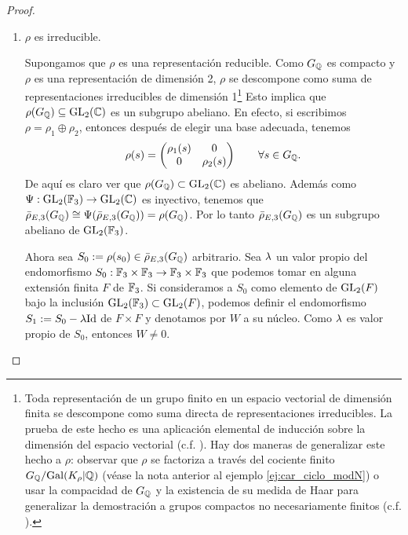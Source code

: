 \documentclass[../../tesis_maestria]{subfiles}
\begin{document}
\begin{proof}
\begin{enumerate}[label=\emph{\roman*})]
  \item $\rho$ es irreducible.

    \-\;\; Supongamos que $\rho$ es una representaci\'on reducible. Como $G_{\mathbb{Q}}$ es compacto y $\rho$ es una representaci\'on de dimensi\'on 2, $\rho$ se descompone como suma de representaciones irreducibles de dimensi\'on 1\footnote{Toda representaci\'on de un grupo finito en un espacio vectorial de dimensi\'on finita se descompone como suma directa de representaciones irreducibles. La prueba de este hecho es una aplicaci\'on elemental de inducci\'on sobre la dimensi\'on del espacio vectorial (c.f. \cite[\S1.4]{SerreLROFG}). Hay dos maneras de generalizar este hecho a $\rho$: observar que $\rho$ se factoriza a trav\'es del cociente finito $G_{\mathbb{Q}}/\mathrm{Gal}(K_{\rho}|\mathbb{Q})$ (v\'ease la nota anterior al ejemplo \ref{ej:car_ciclo_modN}) o usar la compacidad de $G_{\mathbb{Q}}$ y la existencia de su medida de Haar para generalizar la demostraci\'on a grupos compactos no necesariamente finitos (c.f. \cite[\S4.3]{SerreLROFG}).} Esto implica que $\rho(G_{\mathbb{Q}})\subseteq\mathrm{GL}_2(\mathbb{C})$ es un subgrupo abeliano. En efecto, si escribimos $\rho=\rho_1\oplus\rho_2$, entonces despu\'es de elegir una base adecuada, tenemos
    \[
      \rho(s)=\begin{pmatrix}\rho_1(s) & 0\\ 0 & \rho_2(s)\end{pmatrix}\qquad\forall s\in G_{\mathbb{Q}}.
    \]
De aqu\'i es claro ver que $\rho(G_{\mathbb{Q}})\subset\mathrm{GL}_2(\mathbb{C})$ es abeliano. Adem\'as como $\Psi:\mathrm{GL}_2(\mathbb{F}_3)\rightarrow\mathrm{GL}_2(\mathbb{C})$ es inyectivo, tenemos que $\bar{\rho}_{E,3}(G_{\mathbb{Q}})\cong\Psi(\bar{\rho}_{E,3}(G_{\mathbb{Q}}))=\rho(G_{\mathbb{Q}})$. Por lo tanto $\bar{\rho}_{E,3}(G_{\mathbb{Q}})$ es un subgrupo abeliano de $\mathrm{GL}_2(\mathbb{F}_3)$.


\-\;\; Ahora sea $S_0:=\rho(s_0)\in\bar{\rho}_{E,3}(G_{\mathbb{Q}})$ arbitrario. Sea $\lambda$ un valor propio del endomorfismo $S_0:\mathbb{F}_3\times\mathbb{F}_3\rightarrow\mathbb{F}_3\times\mathbb{F}_3$ que podemos tomar en alguna extensi\'on finita $F$ de $\mathbb{F}_3$. Si consideramos a $S_0$ como elemento de $\mathrm{GL}_2(F)$ bajo la inclusi\'on $\mathrm{GL}_2(\mathbb{F}_3)\subset\mathrm{GL}_2(F)$, podemos definir el endomorfismo $S_1:=S_0-\lambda\mathrm{Id}$ de $F\times F$ y denotamos por $W$ a su n\'ucleo. Como $\lambda$ es valor propio de $S_0$, entonces $W\neq0$.


\end{enumerate}
\end{proof}
\end{document}
